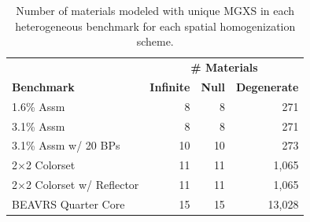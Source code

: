 \begin{table}[h!]
  \centering
  \caption[Number of materials for each spatial homogenization scheme]{Number of materials modeled with unique \ac{MGXS} in each heterogeneous benchmark for each spatial homogenization scheme.}
  \small
  \label{table:chap8-num-materials}
  \vspace{6pt}
  \begin{tabular}{l r r r}
  \toprule
  \rowcolor{lightgray}
  & \multicolumn{3}{c}{\cellcolor{lightgray} \bf \# Materials} \\
  \multirow{-2}{*}{\cellcolor{lightgray} \bf Benchmark} &
  \multicolumn{1}{c}{\cellcolor{lightgray} \bf Infinite} &
  \multicolumn{1}{c}{\cellcolor{lightgray} \bf Null} &
  \multicolumn{1}{c}{\cellcolor{lightgray} \bf Degenerate} \\
  \midrule
1.6\% Assm & 8 & 8 & 271 \\
  \midrule
3.1\% Assm & 8 & 8 & 271 \\
  \midrule
3.1\% Assm w/ 20 BPs & 10 & 10 & 273  \\
  \midrule
2$\times$2 Colorset & 11 & 11 & 1,065 \\
  \midrule
2$\times$2 Colorset w/ Reflector & 11 & 11 & 1,065 \\
  \midrule
\ac{BEAVRS} Quarter Core & 15 & 15 & 13,028 \\ %
  \bottomrule
\end{tabular}
\end{table}

